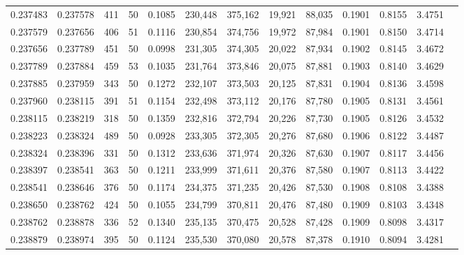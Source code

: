 \begin{tabular}{rrrrrrrrrrrrr}
0.237483 & 0.237578 &   411 &  50 &                                     0.1085 & 230,448 & 375,162 &  19,921 &  88,035 & 0.1901 & 0.8155 & 3.4751 \\
0.237579 & 0.237656 &   406 &  51 &                                     0.1116 & 230,854 & 374,756 &  19,972 &  87,984 & 0.1901 & 0.8150 & 3.4714 \\
0.237656 & 0.237789 &   451 &  50 &                                     0.0998 & 231,305 & 374,305 &  20,022 &  87,934 & 0.1902 & 0.8145 & 3.4672 \\
0.237789 & 0.237884 &   459 &  53 &                                     0.1035 & 231,764 & 373,846 &  20,075 &  87,881 & 0.1903 & 0.8140 & 3.4629 \\
0.237885 & 0.237959 &   343 &  50 &                                     0.1272 & 232,107 & 373,503 &  20,125 &  87,831 & 0.1904 & 0.8136 & 3.4598 \\
0.237960 & 0.238115 &   391 &  51 &                                     0.1154 & 232,498 & 373,112 &  20,176 &  87,780 & 0.1905 & 0.8131 & 3.4561 \\
0.238115 & 0.238219 &   318 &  50 &                                     0.1359 & 232,816 & 372,794 &  20,226 &  87,730 & 0.1905 & 0.8126 & 3.4532 \\
0.238223 & 0.238324 &   489 &  50 &                                     0.0928 & 233,305 & 372,305 &  20,276 &  87,680 & 0.1906 & 0.8122 & 3.4487 \\
0.238324 & 0.238396 &   331 &  50 &                                     0.1312 & 233,636 & 371,974 &  20,326 &  87,630 & 0.1907 & 0.8117 & 3.4456 \\
0.238397 & 0.238541 &   363 &  50 &                                     0.1211 & 233,999 & 371,611 &  20,376 &  87,580 & 0.1907 & 0.8113 & 3.4422 \\
0.238541 & 0.238646 &   376 &  50 &                                     0.1174 & 234,375 & 371,235 &  20,426 &  87,530 & 0.1908 & 0.8108 & 3.4388 \\
0.238650 & 0.238762 &   424 &  50 &                                     0.1055 & 234,799 & 370,811 &  20,476 &  87,480 & 0.1909 & 0.8103 & 3.4348 \\
0.238762 & 0.238878 &   336 &  52 &                                     0.1340 & 235,135 & 370,475 &  20,528 &  87,428 & 0.1909 & 0.8098 & 3.4317 \\
0.238879 & 0.238974 &   395 &  50 &                                     0.1124 & 235,530 & 370,080 &  20,578 &  87,378 & 0.1910 & 0.8094 & 3.4281 \\

\end{tabular}
